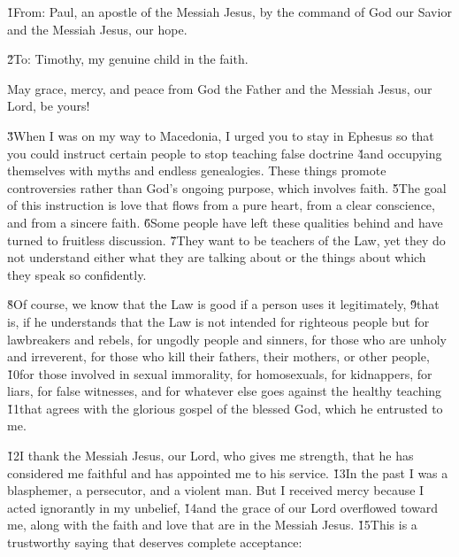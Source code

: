 


\v{1}From: Paul, an apostle of the Messiah Jesus, by the command of God our Savior and the Messiah Jesus, our hope.

\v{2}To: Timothy, my genuine child in the faith.

May grace, mercy, and peace from God the Father and the Messiah Jesus, our Lord, be yours!

\v{3}When I was on my way to Macedonia, I urged you to stay in Ephesus so that you could instruct certain people to stop teaching false doctrine \v{4}and occupying themselves with myths and endless genealogies. These things promote controversies rather than God's ongoing purpose, which involves faith. \v{5}The goal of this instruction is love that flows from a pure heart, from a clear conscience, and from a sincere faith. \v{6}Some people have left these qualities behind and have turned to fruitless discussion. \v{7}They want to be teachers of the Law, yet they do not understand either what they are talking about or the things about which they speak so confidently.

\v{8}Of course, we know that the Law is good if a person uses it legitimately, \v{9}that is, if he understands that the Law is not intended for righteous people but for lawbreakers and rebels, for ungodly people and sinners, for those who are unholy and irreverent, for those who kill their fathers, their mothers, or other people, \v{10}for those involved in sexual immorality, for homosexuals, for kidnappers, for liars, for false witnesses, and for whatever else goes against the healthy teaching \v{11}that agrees with the glorious gospel of the blessed God, which he entrusted to me.

\v{12}I thank the Messiah Jesus, our Lord, who gives me strength, that he has considered me faithful and has appointed me to his service. \v{13}In the past I was a blasphemer, a persecutor, and a violent man. But I received mercy because I acted ignorantly in my unbelief, \v{14}and the grace of our Lord overflowed toward me, along with the faith and love that are in the Messiah Jesus. \v{15}This is a trustworthy saying that deserves complete acceptance:

